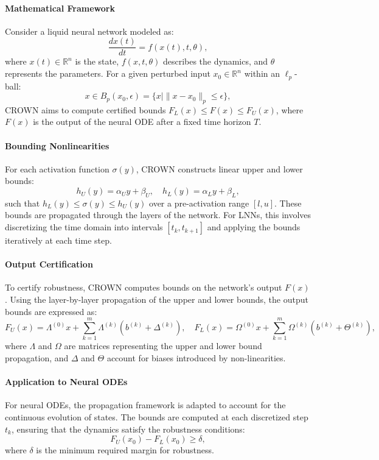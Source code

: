 \paragraph{Mathematical Framework}
Consider a liquid neural network modeled as:
\[
\frac{dx(t)}{dt} = f(x(t), t, \theta),
\]
where \(x(t) \in \mathbb{R}^n\) is the state, \(f(x, t, \theta)\) describes the dynamics, and \(\theta\) represents the parameters. For a given perturbed input \(x_0 \in \mathbb{R}^n\) within an \(\ell_p\)-ball:
\[
x \in B_p(x_0, \epsilon) = \{x \mid \|x - x_0\|_p \leq \epsilon\},
\]
CROWN aims to compute certified bounds \(F_L(x) \leq F(x) \leq F_U(x)\), where \(F(x)\) is the output of the neural ODE after a fixed time horizon \(T\).

\paragraph{Bounding Nonlinearities}
For each activation function \(\sigma(y)\), CROWN constructs linear upper and lower bounds:
\[
h_U(y) = \alpha_U y + \beta_U, \quad h_L(y) = \alpha_L y + \beta_L,
\]
such that \(h_L(y) \leq \sigma(y) \leq h_U(y)\) over a pre-activation range \([l, u]\). These bounds are propagated through the layers of the network. For LNNs, this involves discretizing the time domain into intervals \([t_k, t_{k+1}]\) and applying the bounds iteratively at each time step.

\paragraph{Output Certification}
To certify robustness, CROWN computes bounds on the network's output \(F(x)\). Using the layer-by-layer propagation of the upper and lower bounds, the output bounds are expressed as:
\[
F_U(x) = \Lambda^{(0)} x + \sum_{k=1}^m \Lambda^{(k)} (b^{(k)} + \Delta^{(k)}), \quad
F_L(x) = \Omega^{(0)} x + \sum_{k=1}^m \Omega^{(k)} (b^{(k)} + \Theta^{(k)}),
\]
where \(\Lambda\) and \(\Omega\) are matrices representing the upper and lower bound propagation, and \(\Delta\) and \(\Theta\) account for biases introduced by non-linearities.

\paragraph{Application to Neural ODEs}
For neural ODEs, the propagation framework is adapted to account for the continuous evolution of states. The bounds are computed at each discretized step \(t_k\), ensuring that the dynamics satisfy the robustness conditions:
\[
F_U(x_0) - F_L(x_0) \geq \delta,
\]
where \(\delta\) is the minimum required margin for robustness.

